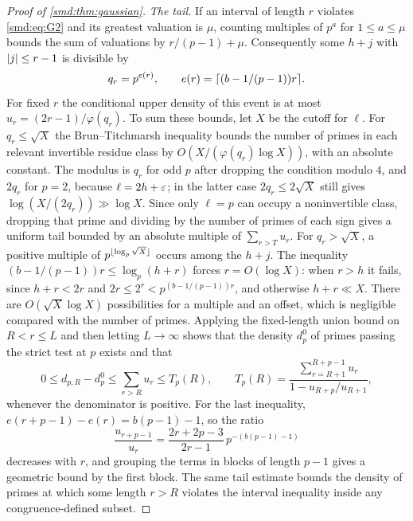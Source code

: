 \begin{proof}[Proof of \cref{smd:thm:gaussian}]
\emph{The tail.} If an interval of length $r$ violates \eqref{smd:eq:G2} and its greatest
valuation is $\mu$, counting multiples of $p^a$ for $1\le a\le\mu$ bounds the sum of
valuations by $r/(p-1)+\mu$. Consequently some $h+j$ with $\lvert j\rvert\le r-1$ is divisible by
\[
 q_r=p^{e(r)},\qquad e(r)=\lceil(b-1/(p-1))r\rceil .
\]
For fixed $r$ the conditional upper density of this event is at most
$u_r=(2r-1)/\varphi(q_r)$. To sum these bounds, let $X$ be the cutoff for $\ell$. For
$q_r\le\sqrt X$ the Brun--Titchmarsh inequality \cite{Montgomery1973Large} bounds the
number of primes in each relevant invertible residue class by
$O(X/(\varphi(q_r)\log X))$, with an absolute constant. The modulus is $q_r$ for odd $p$
after dropping the condition modulo $4$, and $2q_r$ for $p=2$, because
$\ell=2h+\varepsilon$; in the latter case $2q_r\le2\sqrt X$ still gives
$\log(X/(2q_r))\gg\log X$. Since only $\ell=p$ can occupy a noninvertible class, dropping
that prime and dividing by the number of primes of each sign gives a uniform tail bounded
by an absolute multiple of $\sum_{r>T}u_r$. For $q_r>\sqrt X$, a positive multiple of
$p^{\lfloor\log_p\sqrt X\rfloor}$ occurs among the $h+j$. The inequality
$(b-1/(p-1))r\le\log_p(h+r)$ forces $r=O(\log X)$: when $r>h$ it fails, since
$h+r<2r$ and $2r\le2^r<p^{(b-1/(p-1))r}$, and otherwise $h+r\ll X$. There are
$O(\sqrt X\log X)$ possibilities for a multiple and an offset, which is negligible
compared with the number of primes. Applying the fixed-length union bound on $R<r\le L$
and then letting $L\to\infty$ shows that the density $d_p^0$ of primes passing the strict
test at $p$ exists and that
\begin{equation}\label{smd:eq:G3}
 0\le d_{p,R}-d_p^0\le\sum_{r>R}u_r\le T_p(R),\qquad
 T_p(R)=\frac{\sum_{r=R+1}^{R+p-1}u_r}{1-u_{R+p}/u_{R+1}},
\end{equation}
whenever the denominator is positive. For the last inequality, $e(r+p-1)-e(r)=b(p-1)-1$,
so the ratio
\[
 \frac{u_{r+p-1}}{u_r}=\frac{2r+2p-3}{2r-1}\,p^{-(b(p-1)-1)}
\]
decreases with $r$, and grouping the terms in blocks of length $p-1$ gives a geometric
bound by the first block. The same tail estimate bounds the density of primes at which some
length $r>R$ violates the interval inequality inside any congruence-defined subset.


\end{proof}
